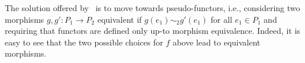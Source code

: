 The solution offered by~\cite{win2017,VismeW19} is to move towards 
pseudo-functors,
i.e., considering two {\eseqabbr} morphisms $g, g' : P_1 \to P_2$ equivalent
if $g(e_1) \sim_2 g'(e_1)$ for all $e_1\in P_1$ and requiring that functors 
are defined only up-to morphism equivalence. 
%
Indeed, it is easy to see that the two possible choices for $f$ above lead to
equivalent morphisms.

  





        
